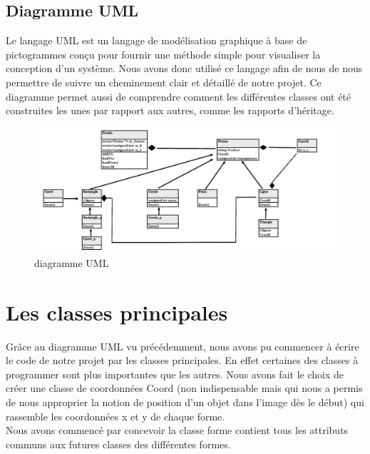 \documentclass[11pt]{article}
\begin{document}
\clearpage

\subsection{Diagramme UML}

Le langage UML est un langage de modélisation graphique à base de pictogrammes conçu pour fournir une méthode simple pour visualiser la conception d'un système. Nous avons donc utilisé ce langage afin de nous de nous permettre de suivre un cheminement clair et détaillé de notre projet. Ce diagramme permet aussi de comprendre comment les différentes classes ont été construites les unes par rapport aux autres, comme les rapports d'héritage. \\

\begin{figure}[!htbp]
    \begin{center}
        \includegraphics[width=20cm]{Photo2.png}
        \caption{diagramme UML}
    \centering
    \end{center}
\end{figure}

\section{Les classes principales}

Grâce au diagramme UML vu précédemment, nous avons pu commencer à écrire le code de notre projet par les classes principales. En effet certaines des classes à programmer sont plus importantes que les autres. Nous avons fait le choix de créer une classe de coordonnées Coord (non indispensable mais qui nous a permis de nous approprier la notion de position d'un objet dans l'image dès le début) qui rassemble les coordonnées x et y de chaque forme. \\

Nous avons commencé par concevoir la classe forme contient tous les attributs communs aux futures classes des différentes formes. 
\end{document}
